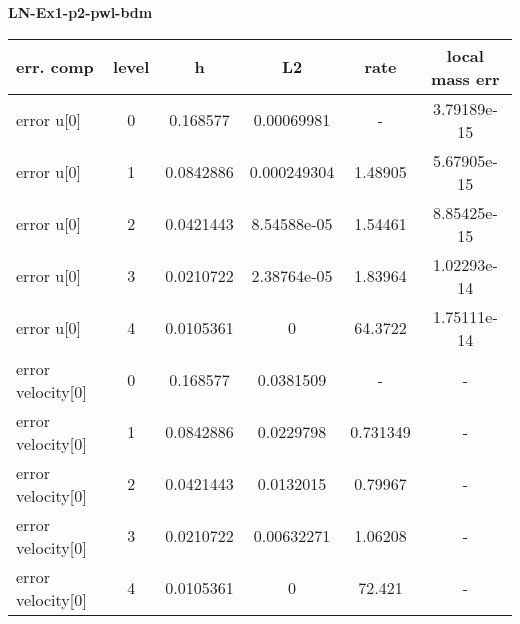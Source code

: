 \documentclass{amsart}
\begin{document}
\begin{center}   
{\bf LN-Ex1-p2-pwl-bdm }\end{center}  
\tableofcontents

\begin{table}[h!]
\begin{tabular}{|l|c|c|c|c|c|}
\hline
err. comp & level & h  & L2 & rate  & local mass err \\ 
\hline
error u[0] & 0 & 0.168577  & 0.00069981  & -   &  3.79189e-15 \\ 
error u[0] & 1 & 0.0842886 & 0.000249304 & 1.48905   &  5.67905e-15 \\ 
error u[0] & 2 & 0.0421443 & 8.54588e-05 & 1.54461   &  8.85425e-15 \\ 
error u[0] & 3 & 0.0210722 & 2.38764e-05 & 1.83964   &  1.02293e-14 \\ 
error u[0] & 4 & 0.0105361 & 0 & 64.3722   &  1.75111e-14 \\ 
error velocity[0] & 0 & 0.168577  & 0.0381509 & -   & - \\ 
error velocity[0] & 1 & 0.0842886 & 0.0229798 & 0.731349   & - \\ 
error velocity[0] & 2 & 0.0421443 & 0.0132015 & 0.79967   & - \\ 
error velocity[0] & 3 & 0.0210722 & 0.00632271 & 1.06208   & - \\ 
error velocity[0] & 4 & 0.0105361 & 0 & 72.421   & - \\ 

\hline
\end{tabular}
\end{table}
\end{document}

